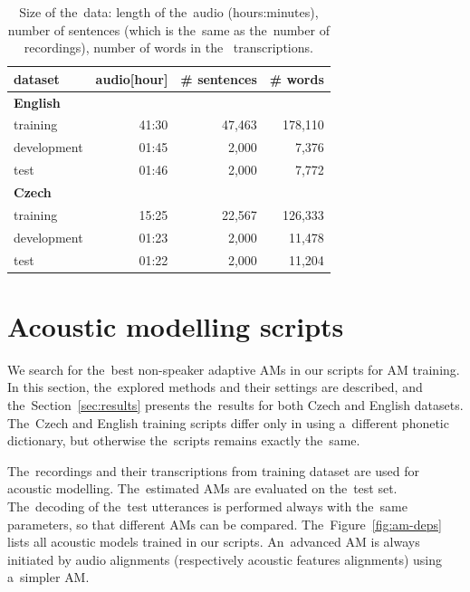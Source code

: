\begin{table}[hbp]
    \centering
    \begin{tabular}{lrrr}
        \hline
        dataset & audio[hour] & \# sentences & \# words \\
        \hline
        \textbf{English} & & & \\
                training & 41:30 & 47,463 & 178,110 \\
                development & 01:45 & 2,000 & 7,376 \\
                test & 01:46 & 2,000 & 7,772 \\
        \hline
        \textbf{Czech} & & & \\
                training & 15:25 & 22,567 & 126,333 \\
                development & 01:23 & 2,000 & 11,478 \\
                test & 01:22 & 2,000 & 11,204 \\
        \hline
		\end{tabular}
    \caption{Size of the~data: length of the~audio (hours:minutes), number of sentences
        (which is the~same as the~number of recordings), number of words in the~
    transcriptions.\cite{korvas_2014}}
    \label{tab:audio}
\end{table}


\section{Acoustic modelling scripts}
\label{sec:am_train}

We search for the~best non-speaker adaptive \acp{AM} in our scripts for \ac{AM} training. 
In this section, the~explored methods and their settings are described, and the~Section~\ref{sec:results} presents the~results for both Czech and English datasets.
The~Czech and English training scripts differ only in using a~different phonetic dictionary, but otherwise the~scripts remains exactly the~same.

The~recordings and their transcriptions from training dataset are used for acoustic modelling.
The~estimated \acp{AM} are evaluated on the~test set.
The~decoding of the~test utterances is performed always with the~same parameters, so that different \acp{AM} can be compared.
The~Figure~\ref{fig:am-deps} lists all acoustic models trained in our scripts.
An~advanced \ac{AM} is always initiated by audio alignments (respectively acoustic features alignments) using a~simpler \ac{AM}.

